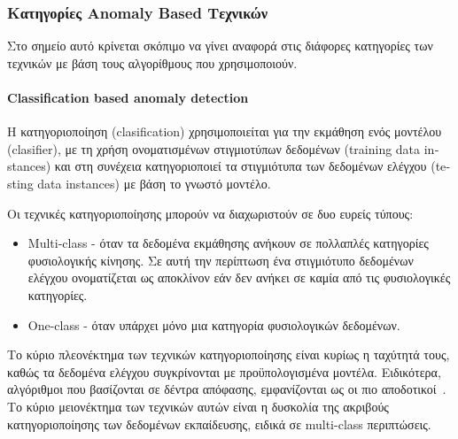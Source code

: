\documentclass[12pt]{report}
\begin{document}
\subsubsection{Κατηγορίες \textlatin{Anomaly Based} Τεχνικών}
Στο σημείο αυτό κρίνεται σκόπιμο να γίνει αναφορά στις διάφορες κατηγορίες των τεχνικών με βάση τους αλγορίθμους που χρησιμοποιούν.
\paragraph{\textlatin{Classification based anomaly detection}} Η κατηγοριοποίηση (\textlatin{clasification}) χρησιμοποιείται για την εκμάθηση ενός μοντέλου (\textlatin{clasifier}), με τη χρήση ονοματισμένων στιγμιοτύπων δεδομένων (\textlatin{training data instances}) και στη συνέχεια κατηγοριοποιεί τα στιγμιότυπα των δεδομένων ελέγχου (\textlatin{testing data instances}) με βάση το γνωστό μοντέλο.

Οι τεχνικές κατηγοριοποίησης μπορούν να διαχωριστούν σε δυο ευρείς τύπους:
\begin{itemize}
	\item \textlatin{Multi-class} - όταν τα δεδομένα εκμάθησης ανήκουν σε πολλαπλές κατηγορίες φυσιολογικής κίνησης. Σε αυτή την περίπτωση ένα στιγμιότυπο δεδομένων ελέγχου ονοματίζεται ως αποκλίνον εάν δεν ανήκει σε καμία από τις φυσιολογικές κατηγορίες.
	\item \textlatin{One-class} - όταν υπάρχει μόνο μια κατηγορία φυσιολογικών δεδομένων.
\end{itemize}

Το κύριο πλεονέκτημα των τεχνικών κατηγοριοποίησης είναι κυρίως η ταχύτητά τους, καθώς τα δεδομένα ελέγχου συγκρίνονται με προϋπολογισμένα μοντέλα. Ειδικότερα, αλγόριθμοι που βασίζονται σε δέντρα απόφασης, εμφανίζονται ως οι πιο αποδοτικοί~\cite{paper:14}. Το κύριο μειονέκτημα των τεχνικών αυτών είναι η δυσκολία της ακριβούς κατηγοριοποίησης των δεδομένων εκπαίδευσης, ειδικά σε \textlatin{multi-class} περιπτώσεις.
\end{document}
